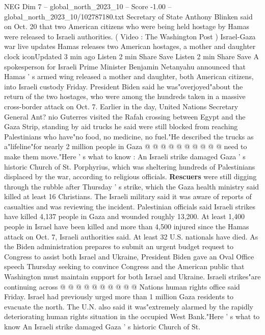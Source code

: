 \begin{textsample}{NEG Dim 7 – global\_north\_2023\_10 – Score -1.00 – global\_north\_2023\_10/102787180.txt}  \label{ex:f7_neg_209}
Secretary of State Anthony Blinken said on Oct. 20 that two American citizens who were being held hostage by Hamas were released to Israeli authorities. ( Video : The Washington Post ) Israel-Gaza war live updates Hamas releases two American hostages, a mother and daughter clock iconUpdated 3 min ago Listen 2 min Share Save Listen 2 min Share Save A spokesperson for Israeli Prime Minister Benjamin Netanyahu announced that Hamas ' s armed wing released a mother and daughter, both American citizens, into Israeli custody Friday.
President Biden said he was"overjoyed"about the return of the two hostages, who were among the hundreds taken in a massive cross-border attack on Oct. 7.
Earlier in the day, United Nations Secretary General Ant? nio Guterres visited the Rafah crossing between Egypt and the Gaza Strip, standing by aid trucks he said were still blocked from reaching Palestinians who have"no food, no medicine, no fuel."He described the trucks as a"lifeline"for nearly 2 million people in Gaza @ @ @ @ @ @ @ @ @ @ need to make them move."Here ' s what to know : An Israeli strike damaged Gaza ' s historic Church of St.
Porphyrius, which was sheltering hundreds of Palestinians displaced by the war, according to religious officials. \textbf{Rescuers} were still digging through the rubble after Thursday ' s strike, which the Gaza health ministry said killed at least 16 Christians.
The Israeli military said it was aware of reports of casualties and was reviewing the incident.
Palestinian officials said Israeli strikes have killed 4,137 people in Gaza and wounded roughly 13,200.
At least 1,400 people in Israel have been killed and more than 4,500 injured since the Hamas attack on Oct. 7, Israeli authorities said.
At least 32 U.S. nationals have died.
As the Biden administration prepares to submit an urgent budget request to Congress to assist both Israel and Ukraine, President Biden gave an Oval Office speech Thursday seeking to convince Congress and the American public that Washington must maintain support for both Israel and Ukraine.
Israeli strikes"are continuing across @ @ @ @ @ @ @ @ @ @ Nations human rights office said Friday.
Israel had previously urged more than 1 million Gaza residents to evacuate the north.
The U.N. also said it was"extremely alarmed by the rapidly deteriorating human rights situation in the occupied West Bank."Here ' s what to know An Israeli strike damaged Gaza ' s historic Church of St.

\end{textsample}
